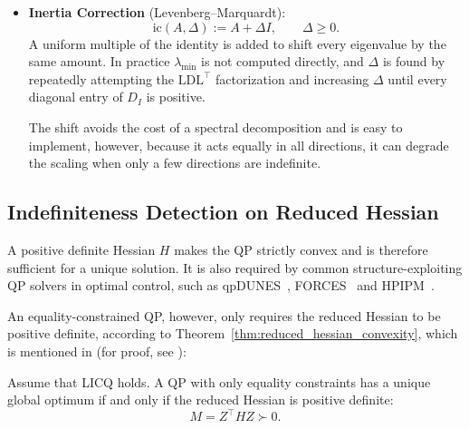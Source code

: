 \documentclass[class=scrbook, crop=false]{standalone}
\begin{document}
\begin{itemize}
    This avoids the cost of an eigendecomposition and still guarantees positive definiteness, 
    but the resulting $E$ is generally not minimal and tends to over-modify $A$.

    \item \textbf{Inertia Correction} (Levenberg--Marquardt):
    \begin{equation*}
        \mathrm{ic}(A, \Delta) := A + \Delta I, \qquad \Delta \geq 0.
    \end{equation*}
    A uniform multiple of the identity is added to shift every eigenvalue by the same amount.
    In practice $\lambda_{\min}$ is not computed directly, 
    and $\Delta$ is found by repeatedly attempting the $\mathrm{LD}\mathrm{L}^\top$ factorization
    and increasing $\Delta$ until every diagonal entry of $D_I$ is positive.

    The shift avoids the cost of a spectral decomposition and is easy to implement,
    however, because it acts equally in all directions,  it can degrade the scaling when only a few directions are indefinite.

\end{itemize}


\subsection{Indefiniteness Detection on Reduced Hessian}
\label{subsec:detection}
A positive definite Hessian $H$ makes the QP strictly convex
and is therefore sufficient for a unique solution.
It is also required by common structure-exploiting QP solvers in optimal control,
such as qpDUNES~\cite{frasch2015parallel}, FORCES~\cite{domahidi2012efficient}
and HPIPM~\cite{frison2020hpipmhighperformancequadraticprogramming}.

An equality-constrained QP, however, only requires the reduced Hessian to be positive definite,
according to Theorem~\ref{thm:reduced_hessian_convexity},
which is mentioned in \cite{verschueren2017sparsity} (for proof, see \cite{nocedal2006numerical}):

\begin{theorem}
\label{thm:reduced_hessian_convexity}
Assume that LICQ holds. A QP with only equality constraints has a unique global optimum if and only if the reduced Hessian is positive definite:
\begin{equation}
    M = Z^\top H Z \succ 0.
\end{equation}
\end{theorem}
\end{document}

